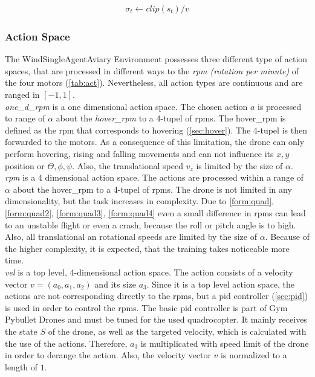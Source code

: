 \newline
\begin{align}
	\sigma_t \leftarrow clip(s_t) / v \label{eq:clipnorm}
\end{align}
\newline

\newpage

\subsubsection{Action Space}
The WindSingleAgentAviary Environment possesses three different type of action spaces, that are processed in different ways to the \emph{rpm (rotation per minute)} of the four motors (\cref{tab:act}). Nevertheless, all action types are continuous and are ranged in $[-1, 1]$.\\
\newline
\emph{one\_d\_rpm} is a one dimensional action space. The chosen action $a$ is processed to range of $\alpha$ about the \emph{hover\_rpm} to a 4-tupel of rpms. The hover\_rpm is defined as the rpm that corresponds to hovering (\cref{sec:hover}). The 4-tupel is then forwarded to the motors. As a consequence of this limitation, the drone can only perform hovering, rising and falling movements and can not influence its $x,y$ position or $\Theta, \phi, \psi$. Also, the translational speed $v_z$ is limited by the size of $\alpha$.\\
\newline
\emph{rpm} is a 4 dimensional action space. The actions are processed within a range of $\alpha$ about the hover\_rpm to a 4-tupel of rpms. The drone is not limited in any dimensionality, but the task increases in complexity. Due to \cref{form:quad}, \cref{form:quad2}, \cref{form:quad3}, \cref{form:quad4} even a small difference in rpms can lead to an unstable flight or even a crash, because the roll or pitch angle is to high. Also, all translational an rotational speeds are limited by the size of $\alpha$. Because of the higher complexity, it is expected, that the training takes noticeable more time.\\
\newline
\emph{vel} is a top level, 4-dimensional action space. The action consists of a velocity vector $v = (a_0, a_1, a_2)$ and its size $a_3$.  Since it is a top level action space, the actions are not corresponding directly to the rpms, but a pid controller (\cref{sec:pid}) is used in order to control the rpms. The basic pid controller is part of Gym Pybullet Drones \cite{panerati2021learning} and must be tuned for the used quadrocopter. It mainly receives the state $S$ of the drone, as well as the targeted velocity, which is calculated with the use of the actions. Therefore, $a_3$ is multiplicated with speed limit of the drone in order to derange the action. Also, the velocity vector $v$ is normalized to a length of $1$.\\
